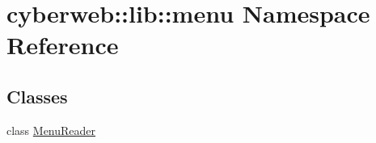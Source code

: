 \hypertarget{namespacecyberweb_1_1lib_1_1menu}{\section{cyberweb\-:\-:lib\-:\-:menu \-Namespace \-Reference}
\label{namespacecyberweb_1_1lib_1_1menu}
}
\subsection*{\-Classes}
\begin{DoxyCompactItemize}
\item 
class \hyperlink{classcyberweb_1_1lib_1_1menu_1_1_menu_reader}{\-Menu\-Reader}
\end{DoxyCompactItemize}
